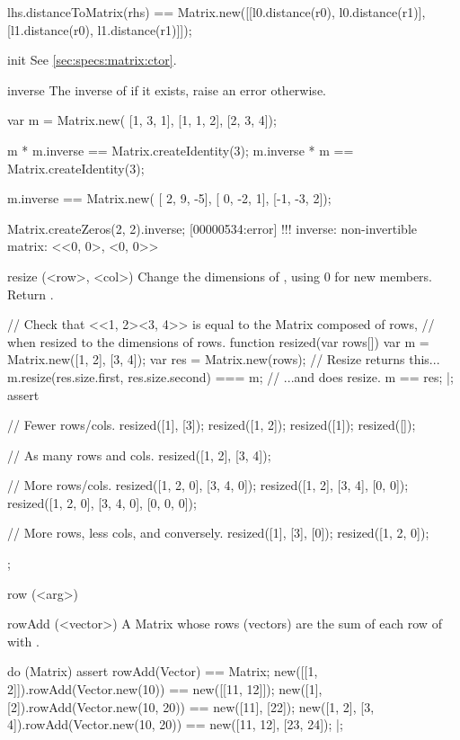 \begin{urbiscriptapi}
\begin{urbiassert}
lhs.distanceToMatrix(rhs)
  == Matrix.new([[l0.distance(r0), l0.distance(r1)],
                 [l1.distance(r0), l1.distance(r1)]]);
\end{urbiassert}

\item[init]%
  See \autoref{sec:specs:matrix:ctor}.

\item[inverse]%
  The inverse of \this if it exists, raise an error otherwise.
\begin{urbiassert}
var m = Matrix.new(
  [1, 3, 1],
  [1, 1, 2],
  [2, 3, 4]);

m * m.inverse == Matrix.createIdentity(3);
m.inverse * m == Matrix.createIdentity(3);

m.inverse == Matrix.new(
  [ 2,  9, -5],
  [ 0, -2,  1],
  [-1, -3,  2]);

Matrix.createZeros(2, 2).inverse;
[00000534:error] !!! inverse: non-invertible matrix: <<0, 0>, <0, 0>>
\end{urbiassert}

\item[resize](<row>, <col>)%
  Change the dimensions of \this, using 0 for new members.  Return \this.
\begin{urbiscript}
// Check that <<1, 2><3, 4>> is equal to the Matrix composed of rows,
// when resized to the dimensions of rows.
function resized(var rows[])
{
  var m = Matrix.new([1, 2], [3, 4]);
  var res = Matrix.new(rows);
  // Resize returns this...
  m.resize(res.size.first, res.size.second) === m;
  // ...and does resize.
  m == res;
}|;
assert
{
  // Fewer rows/cols.
  resized([1], [3]);
  resized([1, 2]);
  resized([1]);
  resized([]);

  // As many rows and cols.
  resized([1, 2], [3, 4]);

  // More rows/cols.
  resized([1, 2, 0], [3, 4, 0]);
  resized([1, 2], [3, 4], [0, 0]);
  resized([1, 2, 0], [3, 4, 0], [0, 0, 0]);

  // More rows, less cols, and conversely.
  resized([1], [3], [0]);
  resized([1, 2, 0]);
};
\end{urbiscript}

\item[row](<arg>)%
\begin{urbiassert}

\end{urbiassert}

\item[rowAdd](<vector>)%
  A Matrix whose rows (vectors) are the sum of each row of \this with
  .
\begin{urbiscript}
do (Matrix)
{
  assert
  {
    rowAdd(Vector) == Matrix;
    new([[1, 2]]).rowAdd(Vector.new(10))     == new([[11, 12]]);
    new([1], [2]).rowAdd(Vector.new(10, 20)) == new([11], [22]);
    new([1, 2], [3, 4]).rowAdd(Vector.new(10, 20)) == new([11, 12], [23, 24]);
  }
}|;
\end{urbiscript}


\end{urbiscriptapi}

